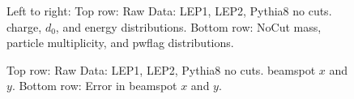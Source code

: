 \begin{figure}[H]
\hfill
\caption{Left to right: Top row: Raw Data: LEP1, LEP2, Pythia8 no cuts. charge, $d_0$, and energy distributions. Bottom row: NoCut mass, particle multiplicity, and pwflag distributions.}
\end{figure}

\begin{figure}[H]
\centering
{}\hfill
{}\hfill %
\hfill
{}\hfill
\caption{Top row: Raw Data: LEP1, LEP2, Pythia8 no cuts. beamspot $x$ and $y$. Bottom row: Error in beamspot $x$ and $y$.}
\end{figure}

